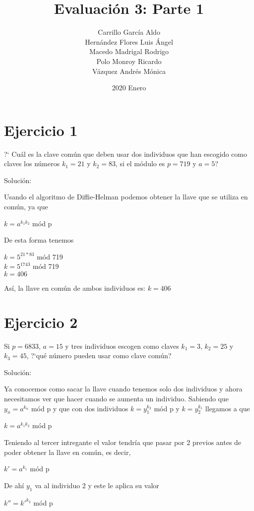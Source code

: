 \documentclass[12pt]{article}
\title{Evaluación 3: Parte 1}
\date{2020 Enero}
\author{Carrillo García Aldo \\ Hernández Flores Luis Ángel \\ Macedo Madrigal Rodrigo \\ Polo Monroy Ricardo \\ Vázquez Andrés Mónica}
\begin{document}
\maketitle
\section{Ejercicio 1}
?` Cuál es la clave común que deben usar dos individuos que han escogido como claves los números $k_{1} = 21$ y $k_{2} = 83$, si el módulo es $p = 719$ y $a = 5$?

\par Solución: 

Usando el algoritmo de Diffie-Helman podemos obtener la llave que se utiliza en común, ya que 
\begin{center}
    $k = a^{k_{1}k_{2}}$ mód p
\end{center}

De esta forma tenemos 
\begin{center}
    $k = 5^{21 * 83}$ mód 719 \\
    $k = 5^{1743}$ mód 719 \\
    $k = 406$
\end{center}

Así, la llave en común de ambos individuos es: $k = 406$
\section{Ejercicio 2}
Si $p = 6833$, $a = 15$ y tres individuos escogen como claves $k_{1} = 3$, $k_{2} = 25$ y $k_{3} = 45$, ?`qué número pueden usar como clave común?

\par Solución: 

Ya conocemos como sacar la llave cuando tenemos solo dos individuos y ahora necesitamos ver que hacer cuando se aumenta un individuo.
Sabiendo que $y_{n} = a^{k_{n}}$ mód p y que con dos individuos $k = y_{1}^{k_{2}}$ mód p y $k = y_{2}^{k_{1}}$ llegamos a que 
\begin{center}
    $k = a^{k_{1}k_{2}}$ mód p
\end{center}

Teniendo al tercer intregante el valor tendría que pasar por 2 previos antes de poder obtener la llave en común, es decir, 
\begin{center}
    $k' = a^{k_{1}}$ mód p
\end{center}

De ahí $y_{1}$ va al individuo 2 y este le aplica su valor
\begin{center}
    $k'' = k'^{k_{2}}$ mód p
\end{center}
\end{document}
